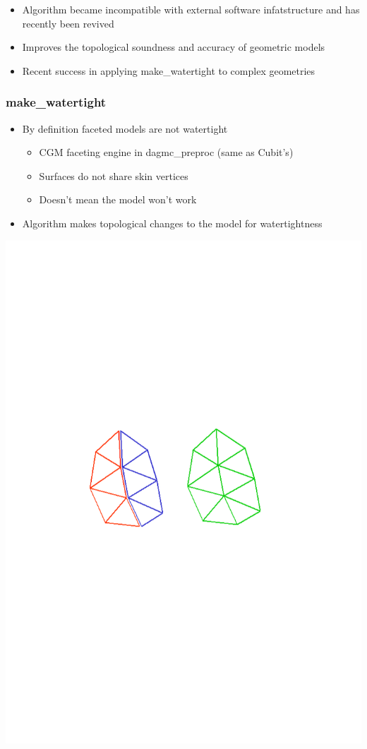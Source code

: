 \documentclass[14pt]{beamer}
\begin{document}
\begin{frame}
\begin{itemize}
\frametitle{make\_watertight}
\item Algorithm became incompatible with external software infatstructure and has recently been revived
\item Improves the topological soundness and accuracy of geometric models
\item Recent success in applying make\_watertight to complex geometries
\end{itemize}
\end{frame}

\begin{frame}
\frametitle{make\_watertight}

\begin{itemize}
\vfill
\item By definition faceted models are not watertight
	\begin{itemize}
	\item CGM faceting engine in dagmc\_preproc (same as Cubit's)
	\item Surfaces do not share skin vertices
	\item Doesn't mean the model won't work
	\end{itemize}
\vfill
\item Algorithm makes topological changes to the model for watertightness

\end{itemize}
\includegraphics[scale=0.45, trim = -100 0 0 250 ]{stitch00.png}


\end{frame}
\end{document}
